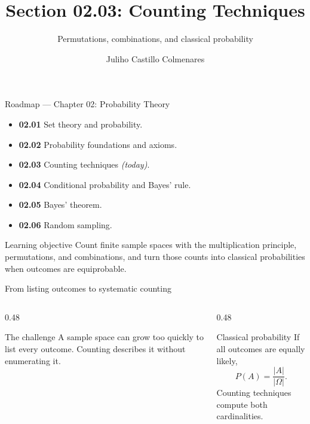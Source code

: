 \documentclass[10pt,aspectratio=169]{beamer}
\title[Counting Techniques]{Section 02.03: Counting Techniques}
\subtitle{Permutations, combinations, and classical probability}
\author[J. Castillo Colmenares]{Juliho Castillo Colmenares}
\institute{Tecnológico de Monterrey}
\date{\vspace{-1.5cm}}
\begin{document}
\begin{frame}[plain]
  \vspace{-0.8cm}
  \titlepage
\end{frame}

\begin{frame}{Roadmap --- Chapter 02: Probability Theory}
  \scriptsize
  \begin{itemize}\itemsep=0.04em
    \item \textbf{02.01} Set theory and probability.
    \item \textbf{02.02} Probability foundations and axioms.
    \item \textbf{02.03} Counting techniques \emph{(today)}.
    \item \textbf{02.04} Conditional probability and Bayes' rule.
    \item \textbf{02.05} Bayes' theorem.
    \item \textbf{02.06} Random sampling.
  \end{itemize}
  \vspace{-0.05cm}
  \begin{block}{Learning objective}
    Count finite sample spaces with the multiplication principle, permutations,
    and combinations, and turn those counts into classical probabilities when
    outcomes are equiprobable.
  \end{block}
\end{frame}

\begin{frame}{From listing outcomes to systematic counting}
  \small
  \begin{columns}[T]
    \begin{column}{0.48\textwidth}
      \begin{block}{The challenge}
        A sample space can grow too quickly to list every outcome. Counting
        describes it without enumerating it.
      \end{block}
    \end{column}
    \begin{column}{0.48\textwidth}
      \begin{alertblock}{Classical probability}
        If all outcomes are equally likely,
        \[
          P(A)=\frac{\lvert A\rvert}{\lvert\Omega\rvert}.
        \]
        Counting techniques compute both cardinalities.
      \end{alertblock}
    \end{column}
  \end{columns}
\end{frame}
\end{document}
